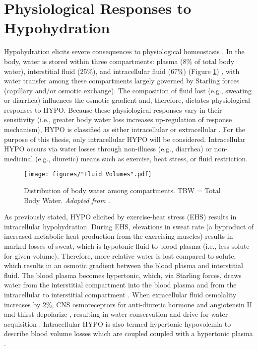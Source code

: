 \section{Physiological Responses to Hypohydration}
Hypohydration elicits severe consequences to physiological homeostasis \cite{iom_dietary_2004}. In the body, water is stored within three compartments: plasma (8\% of total body water), interstitial fluid (25\%), and intracellular fluid (67\%) (Figure \ref{fig:fluidVolumes}) \cite{sawka_thermoregulatory_1985}, with water transfer among these compartments largely governed by Starling forces (capillary and/or osmotic exchange). The composition of fluid lost (e.g., sweating or diarrhea) influences the osmotic gradient and, therefore, dictates physiological responses to HYPO. Because these physiological responses vary in their sensitivity (i.e., greater body water loss increases up-regulation of response mechanism), HYPO is classified as either intracellular or extracellular \cite{cheuvront_dehydration:_2014}. For the purpose of this thesis, only intracellular HYPO will be considered. Intracellular HYPO occurs via water losses through non-illness (e.g., diarrhea) or non-medicinal (e.g., diuretic) means such as exercise, heat stress, or fluid restriction. 

\begin{figure}
	\centering
	\texttt{[image: figures/"Fluid Volumes".pdf]}
	\caption{Distribution of body water among compartments. TBW = Total Body Water. \textit{Adapted from \cite{sawka_thermoregulatory_1985}}.}
	\label{fig:fluidVolumes}
\end{figure}

As previously stated, HYPO elicited by exercise-heat stress (EHS) results in intracellular hypohydration. During EHS, elevations in sweat rate (a byproduct of increased metabolic heat production from the exercising muscles) \cite{sawka_integrated_2011} results in marked losses of sweat, which is hypotonic fluid to blood plasma (i.e., less solute for given volume). Therefore, more relative water is lost compared to solute, which results in an osmotic gradient between the blood plasma and interstitial fluid. The blood plasma becomes hypertonic, which, via Starling forces, draws water from the interstitial compartment into the blood plasma and from the intracellular to interstitial compartment \cite{cheuvront_dehydration:_2014}. When exracellular fluid osmolality increases by 2\%, CNS osmoreceptors for anti-diuretic hormone and angiotensin II and thirst depolarize \cite{bourque_central_2008}, resulting in water conservation and drive for water acquisition \cite{andreoli_endocrine_2010}. Intracellular HYPO is also termed hypertonic hypovolemia to describe blood volume losses which are coupled coupled with a hypertonic plasma \cite{darrow_changes_1935}. 

